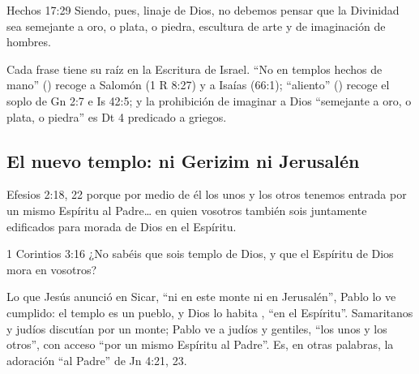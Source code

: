 \begin{verso}{Hechos 17:29}
Siendo, pues, linaje de Dios, no debemos pensar que la Divinidad sea semejante a oro, o plata, o piedra, escultura de arte y de imaginación de hombres.
\end{verso}

Cada frase tiene su raíz en la Escritura de Israel. ``No en templos hechos de mano'' () recoge a Salomón (1 R 8:27) y a Isaías (66:1); ``aliento'' () recoge el soplo de Gn 2:7 e Is 42:5; y la prohibición de imaginar a Dios ``semejante a oro, o plata, o piedra'' es Dt 4 predicado a griegos.


\subsection{El nuevo templo: ni Gerizim ni Jerusalén}

\begin{verso}{Efesios 2:18, 22}
porque por medio de él los unos y los otros tenemos entrada por un mismo Espíritu al Padre\ldots{} en quien vosotros también sois juntamente edificados para morada de Dios en el Espíritu.
\end{verso}

\begin{verso}{1 Corintios 3:16}
¿No sabéis que sois templo de Dios, y que el Espíritu de Dios mora en vosotros?
\end{verso}

Lo que Jesús anunció en Sicar, ``ni en este monte ni en Jerusalén'', Pablo lo ve cumplido: el templo es un pueblo, y Dios lo habita , ``en el Espíritu''. Samaritanos y judíos discutían por un monte; Pablo ve a judíos y gentiles, ``los unos y los otros'', con acceso ``por un mismo Espíritu al Padre''. Es, en otras palabras, la adoración ``al Padre'' de Jn 4:21, 23.

